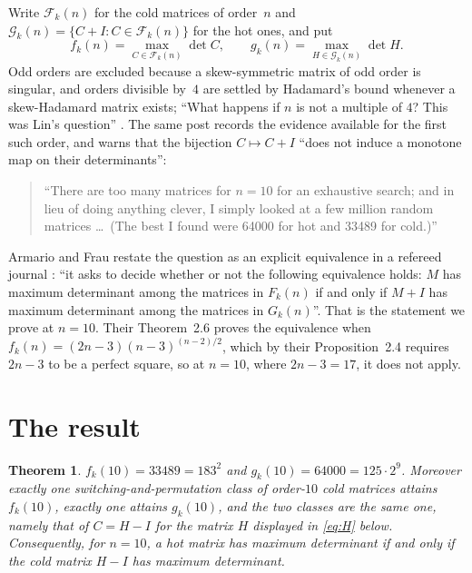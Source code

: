 \documentclass[11pt]{amsart}
\newtheorem{theorem}{Theorem}
\theoremstyle{remark}
\newcommand{\Fk}{\mathcal F_k}
\newcommand{\Gk}{\mathcal G_k}
\begin{document}
Write $\Fk(n)$ for the cold matrices of order~$n$ and $\Gk(n)=\{C+I: C\in\Fk(n)\}$ for the
hot ones, and put
\[
  f_k(n)=\max_{C\in\Fk(n)}\det C,
  \qquad
  g_k(n)=\max_{H\in\Gk(n)}\det H .
\]
Odd orders are excluded because a skew-symmetric matrix of odd order is singular, and
orders divisible by~$4$ are settled by Hadamard's bound whenever a skew-Hadamard matrix
exists; ``What happens if $n$ is not a multiple of $4$? This was Lin's question''
\cite{Cameron2011}. The same post records the evidence available for the first such
order, and warns that the bijection $C\mapsto C+I$ ``does not induce a monotone map on
their determinants'':

\begin{quote}
``There are too many matrices for $n = 10$ for an exhaustive search; and in lieu of doing
anything clever, I simply looked at a few million random matrices \ldots\ (The best I
found were 64000 for hot and 33489 for cold.)''
\end{quote}

Armario and Frau restate the question as an explicit equivalence in a refereed journal
\cite[\S1]{ArmarioFrau2016}: ``it asks to decide whether or not the following equivalence
holds: $M$ has maximum determinant among the matrices in $F_k(n)$ if and only if $M + I$
has maximum determinant among the matrices in $G_k(n)$''. That is the statement we prove
at $n=10$. Their Theorem~2.6 proves the equivalence when
$f_k(n)=(2n-3)(n-3)^{(n-2)/2}$, which by their Proposition~2.4 requires $2n-3$ to be a
perfect square, so at $n=10$, where $2n-3=17$, it does not apply.

\section{The result}\label{sec:res}

\begin{theorem}\label{thm:main}
$f_k(10)=33489=183^2$ and $g_k(10)=64000=125\cdot2^{9}$. Moreover exactly one
switching-and-permutation class of order-$10$ cold matrices attains $f_k(10)$, exactly one
attains $g_k(10)$, and the two classes are the same one, namely that of $C=H-I$ for the
matrix $H$ displayed in \eqref{eq:H} below. Consequently, for $n=10$, a hot matrix has
maximum determinant if and only if the cold matrix $H-I$ has maximum determinant.
\end{theorem}
\end{document}
